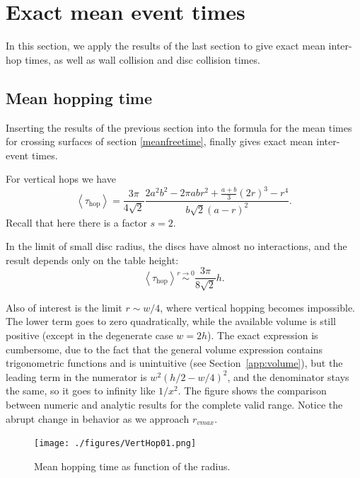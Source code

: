 \documentclass[superscriptaddress,pre,reprint,showpacs,twocolumn]{revtex4-1}
\newcommand{\mean}[1]{\left \langle #1 \right \rangle}
\begin{document}
\section{Exact mean event times}

In this section, we apply the results of the last section to give
exact mean inter-hop times, as well as wall collision and disc collision times.


\subsection{Mean hopping time}

 
Inserting the results of the previous section 
into the formula for the mean times for crossing
surfaces of section \eqref{meanfreetime}, finally gives exact mean inter-event times.

For vertical
hops we have
\begin{equation}\label{hoptau}
 \mean{\tau_\text{hop}} = 	
\frac{3 \pi}{4\sqrt{2}}
\frac{2 a^{2} b^{2}  - 2 \pi a b r^{2} + \textstyle \frac{a+b}{3}  (2r)^{3}  -  r^4}
{ b \sqrt{2}  ( a - r )^2}.
\end{equation}
Recall that here there is a factor $s = 2$.

In the limit of small disc radius, the discs have almost no interactions, and the result depends only
on the table height:
\begin{equation}\label{hoptaulimit}
 \mean{\tau_\text{hop}} \overset{r \to 0}{\sim}
\frac{3 \pi}{8\sqrt{2}}h.
\end{equation}

Also of interest is the limit $r\sim w/4$, where vertical hopping becomes
impossible.  The lower term goes to zero quadratically, while the available volume
is still positive (except in the degenerate case $w=2h$). The exact expression
is cumbersome, due to the fact that the general volume expression contains trigonometric functions
 and is unintuitive (see Section~\ref{app:volume}),
but the leading term in the numerator is  $w^2(h/2-w/4)^2$, and the denominator
stays the same, so
it goes to infinity
like $1/x^2$. The figure \label{MeanHopp01} shows the comparison between
numeric and analytic results for the complete valid range. Notice the abrupt
change in behavior as we approach $r_{vmax}$.


\begin{figure}[h]
  \centering
  \texttt{[image: ./figures/VertHop01.png]}
  \caption{Mean hopping time as function of the radius.}\label{MeanHopp01}
\end{figure}
\end{document}
